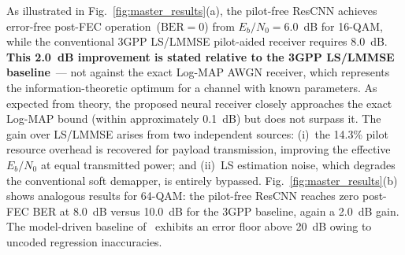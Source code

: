 \documentclass{ieeeaccess}
\begin{document}
As illustrated in Fig.~\ref{fig:master_results}(a), the pilot-free ResCNN achieves
error-free post-FEC operation~($\mathrm{BER}=0$) from $E_b/N_0=6.0$~dB for 16-QAM,
while the conventional 3GPP LS/LMMSE pilot-aided receiver requires 8.0~dB.
\textbf{This 2.0~dB improvement is stated relative to the 3GPP LS/LMMSE baseline}~---
not against the exact Log-MAP AWGN receiver, which represents the information-theoretic
optimum for a channel with known parameters.
As expected from theory, the proposed neural receiver closely approaches the exact
Log-MAP bound (within approximately 0.1~dB) but does not surpass it.
The gain over LS/LMMSE arises from two independent sources:
(i)~the 14.3\% pilot resource overhead is recovered for payload transmission,
improving the effective $E_b/N_0$ at equal transmitted power; and
(ii)~LS estimation noise, which degrades the conventional soft demapper, is
entirely bypassed.
Fig.~\ref{fig:master_results}(b) shows analogous results for 64-QAM: the pilot-free
ResCNN reaches zero post-FEC BER at 8.0~dB versus 10.0~dB for the 3GPP baseline,
again a 2.0~dB gain. The model-driven baseline of~\cite{ye2018} exhibits an error
floor above 20~dB owing to uncoded regression inaccuracies.
\end{document}

